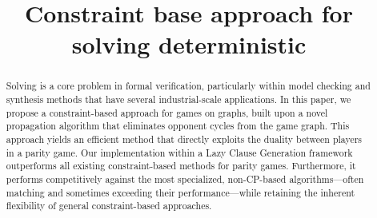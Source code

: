 \documentclass[preprint,12pt,authoryear]{elsarticle}
\begin{document}
\begin{frontmatter}



\title{Constraint base approach for solving deterministic \wregulargames} %





\author{} %


\begin{abstract}
Solving \wregulargames is a core problem in formal verification, particularly within model checking and synthesis methods that have several industrial-scale applications. In this paper, we propose a constraint-based approach for games on graphs, built upon a novel propagation algorithm that eliminates opponent cycles from the game graph. This approach yields an efficient method that directly exploits the duality between players in a parity game. Our implementation within a Lazy Clause Generation framework outperforms all existing constraint-based methods for parity games. Furthermore, it performs competitively against the most specialized, non-CP-based algorithms---often matching and sometimes exceeding their performance---while retaining the inherent flexibility of general constraint-based approaches. 


\end{abstract}
\end{frontmatter}
\end{document}
